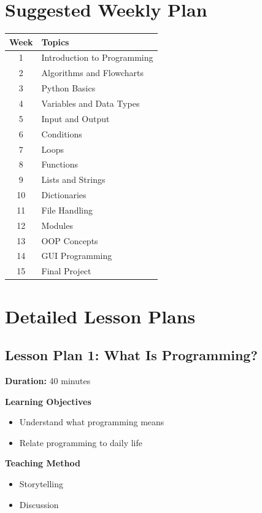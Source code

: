 \section*{Suggested Weekly Plan}

\begin{center}
\begin{tabular}{|c|l|}
\hline
\textbf{Week} & \textbf{Topics} \\
\hline
1 & Introduction to Programming \\
2 & Algorithms and Flowcharts \\
3 & Python Basics \\
4 & Variables and Data Types \\
5 & Input and Output \\
6 & Conditions \\
7 & Loops \\
8 & Functions \\
9 & Lists and Strings \\
10 & Dictionaries \\
11 & File Handling \\
12 & Modules \\
13 & OOP Concepts \\
14 & GUI Programming \\
15 & Final Project \\
\hline
\end{tabular}
\end{center}

\newpage
\section*{Detailed Lesson Plans}

\subsection*{Lesson Plan 1: What Is Programming?}

\textbf{Duration:} 40 minutes

\textbf{Learning Objectives}
\begin{itemize}
    \item Understand what programming means
    \item Relate programming to daily life
\end{itemize}

\textbf{Teaching Method}
\begin{itemize}
    \item Storytelling
    \item Discussion
\end{itemize}

